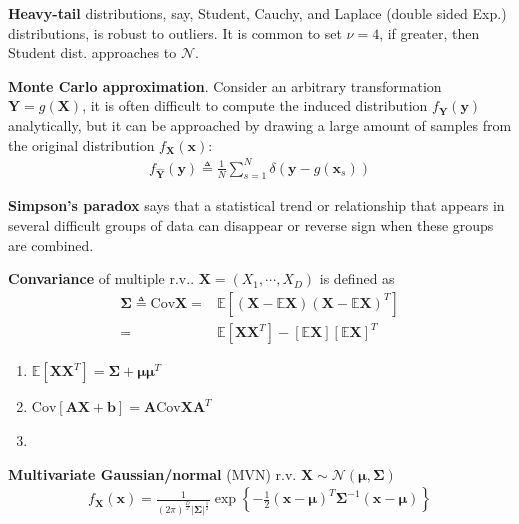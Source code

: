 \textbf{Heavy-tail} distributions, say, 
Student, Cauchy, and Laplace (double sided Exp.) distributions, 
is robust to outliers. 
It is common to set $\nu=4$, if greater, then Student dist. approaches to $\mathcal{N}$.

\textbf{Monte Carlo approximation}. 
Consider an arbitrary transformation $\bm{Y}=g(\bm{X})$,
it is often difficult to compute the induced distribution $f_{\bm{Y}}(\bm{y})$ analytically,
but it can be approached by drawing a large amount of samples 
from the original distribution $f_{\bm{X}}(\bm{x})$:
\begin{gather}
    f_{\hat{\bm{Y}}}(\bm{y})
    \triangleq
    \frac{1}{N}\sum_{s=1}^N\delta(\bm{y}-g(\bm{x}_s))
\end{gather}

\textbf{Simpson's paradox} says that a statistical trend or relationship 
that appears in several difficult groups of data can disappear or reverse sign 
when these groups are combined.

\textbf{Convariance} of multiple r.v.. $\bm{X}=(X_1,\cdots,X_D)$ is defined as 
\begin{align}
    \bm{\Sigma}\triangleq\mathrm{Cov}\bm{X}
    =& \mathbb{E}\left[
    (\bm{X}-\mathbb{E}\bm{X})
    (\bm{X}-\mathbb{E}\bm{X})^T
    \right]\\
    =& \mathbb{E}[\bm{XX}^T]-[\mathbb{E}\bm{X}][\mathbb{E}\bm{X}]^T
\end{align}
\begin{enumerate}
    \item $\mathbb{E}[\bm{XX}^T]=\bm{\Sigma}+\bm{\mu}\bm{\mu}^T$
    \item $\mathrm{Cov}[\bm{AX}+\bm{b}]=\bm{A}\mathrm{Cov}\bm{X}\bm{A}^T$
    \item {}
\end{enumerate}

\textbf{Multivariate Gaussian/normal} (MVN) r.v. 
$\bm{X}\sim\mathcal{N}(\bm{\mu},\bm{\Sigma})$
\begin{gather}
    f_{\bm{X}}(\bm{x})
    = \frac{1}{(2\pi)^\frac{D}{2}|\bm{\Sigma}|^\frac{1}{2}}
    \exp\left\{ 
        -\frac{1}{2}
        (\bm{x}-\bm{\mu})^T
        \bm{\Sigma}^{-1}
        (\bm{x}-\bm{\mu}) 
    \right\}
\end{gather}

